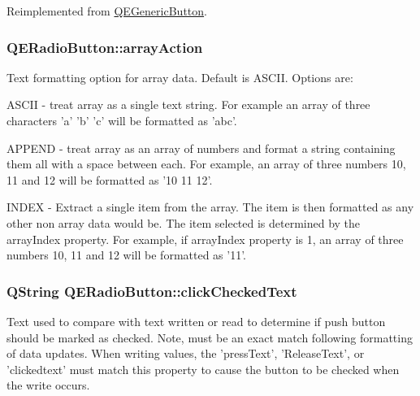 Reimplemented from \hyperlink{classQEGenericButton}{QEGenericButton}.

\hypertarget{classQERadioButton_aa9fcd012234b6ff09a5def4005afba53}{
\subsubsection[{arrayAction}]{ QERadioButton::arrayAction}}
\label{classQERadioButton_aa9fcd012234b6ff09a5def4005afba53}
Text formatting option for array data. Default is ASCII. Options are: \begin{DoxyItemize}
\item ASCII -\/ treat array as a single text string. For example an array of three characters 'a' 'b' 'c' will be formatted as 'abc'. \item APPEND -\/ treat array as an array of numbers and format a string containing them all with a space between each. For example, an array of three numbers 10, 11 and 12 will be formatted as '10 11 12'. \item INDEX -\/ Extract a single item from the array. The item is then formatted as any other non array data would be. The item selected is determined by the arrayIndex property. For example, if arrayIndex property is 1, an array of three numbers 10, 11 and 12 will be formatted as '11'. \end{DoxyItemize}
\hypertarget{classQERadioButton_a9216f3b8c8190c929a55abbb003d4020}{
\subsubsection[{clickCheckedText}]{\setlength{\rightskip}{0pt plus 5cm}QString QERadioButton::clickCheckedText}}
\label{classQERadioButton_a9216f3b8c8190c929a55abbb003d4020}
Text used to compare with text written or read to determine if push button should be marked as checked. Note, must be an exact match following formatting of data updates. When writing values, the 'pressText', 'ReleaseText', or 'clickedtext' must match this property to cause the button to be checked when the write occurs.

